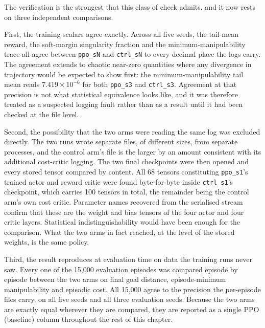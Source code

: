 The verification is the strongest that this class of check admits, and it now rests on three
independent comparisons.

First, the training scalars agree exactly. Across all five seeds, the tail-mean reward, the
soft-margin singularity fraction and the minimum-manipulability trace all agree between
\texttt{ppo\_sN} and \texttt{ctrl\_sN} to every decimal place the logs carry. The agreement
extends to chaotic near-zero quantities where any divergence in trajectory would be expected to
show first: the minimum-manipulability tail mean reads \(7.419\times10^{-6}\) for both
\texttt{ppo\_s3} and \texttt{ctrl\_s3}. Agreement at that precision is not what statistical
equivalence looks like, and it was therefore treated as a suspected logging fault rather than as
a result until it had been checked at the file level.

Second, the possibility that the two arms were reading the same log was excluded directly. The
two runs wrote separate files, of different sizes, from separate processes, and the control arm's
file is the larger by an amount consistent with its additional cost-critic logging. The two final
checkpoints were then opened and every stored tensor compared by content. All 68 tensors
constituting \texttt{ppo\_s1}'s trained actor and reward critic were found byte-for-byte inside
\texttt{ctrl\_s1}'s checkpoint, which carries 100 tensors in total, the remainder being the
control arm's own cost critic. Parameter names recovered from the serialised stream confirm that
these are the weight and bias tensors of the four actor and four critic layers. Statistical indistinguishability would
have been enough for the comparison. What the two arms in fact reached, at the level of the
stored weights, is the same policy.

Third, the result reproduces at evaluation time on data the training runs never saw. Every one
of the 15{,}000 evaluation episodes was compared episode by episode between the two arms on
final goal distance, episode-minimum manipulability and episodic cost. All 15{,}000 agree to the
precision the per-episode files carry, on all five seeds and all three evaluation seeds. Because
the two arms are exactly equal wherever they are compared, they are reported as a single PPO
(baseline) column throughout the rest of this chapter.

